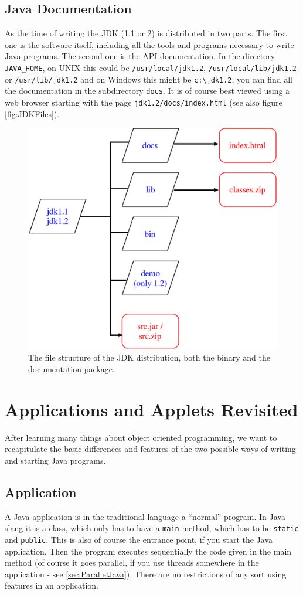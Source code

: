 \subsection{Java Documentation}
As the time of writing the JDK (1.1 or 2) is distributed in
two parts. The first one is the software itself, including all
the tools and programs necessary to write Java programs. 
The second one is the API documentation. 
In the directory \verb|JAVA_HOME|, on UNIX this could be 
\verb|/usr/local/jdk1.2|, \verb|/usr/local/lib/jdk1.2| or 
\verb|/usr/lib/jdk1.2| and on Windows this might be \verb|c:\jdk1.2|, 
you can find all the documentation in the subdirectory
\verb|docs|. It is of course best viewed using a web browser
starting with the page \verb|jdk1.2/docs/index.html| 
(see also figure \ref{fig:JDKFiles}).
\begin{figure}[htbp]
  \begin{center}
    \includegraphics[width=.6\textwidth]{Figures/JDKDocumentation.eps}
    \caption{The file structure of the JDK distribution, both the binary and the documentation package.}
    \label{fig:JDKDocumentation}
  \end{center}
\end{figure}


\section{Applications and Applets Revisited}

After learning many things about object oriented programming,
we want to recapitulate the basic differences and features of
the two possible ways of writing and starting Java programs.

\subsection{Application}
A Java application is in the traditional language a ``normal'' program.
In Java slang it is a class, which only has to have a \verb|main|
method, which has to be \verb|static| and \verb|public|. This is also of course the
entrance point, if you start the Java application. Then the program
executes sequentially the code given in the main method (of course it
goes parallel, if you use threads somewhere in the application - see
\ref{sec:ParallelJava}). There are no restrictions of any sort using
features in an application.


